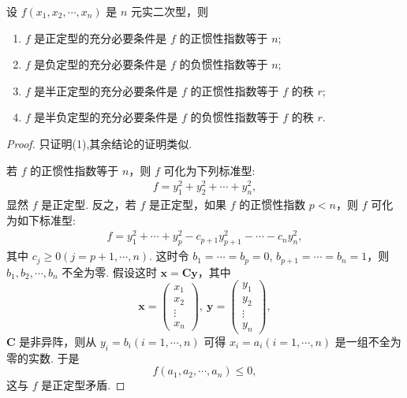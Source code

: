 \documentclass[../../main.tex]{subfiles}
\begin{document}
\begin{theorem}\label{theorem:正定型的充要条件}
设 $f(x_1,x_2,\cdots,x_n)$ 是 $n$ 元实二次型，则 
\begin{enumerate}[(1)]
\item $f$ 是正定型的充分必要条件是 $f$ 的正惯性指数等于 $n$;

\item $f$ 是负定型的充分必要条件是 $f$ 的负惯性指数等于 $n$; 

\item $f$ 是半正定型的充分必要条件是 $f$ 的正惯性指数等于 $f$ 的秩 $r$; 

\item $f$ 是半负定型的充分必要条件是 $f$ 的负惯性指数等于 $f$ 的秩 $r$.
\end{enumerate}
\end{theorem}
\begin{proof}
只证明(1),其余结论的证明类似. 

若 $f$ 的正惯性指数等于 $n$，则 $f$ 可化为下列标准型:
\begin{align*}
f = y_1^2 + y_2^2 + \cdots + y_n^2,
\end{align*}
显然 $f$ 是正定型. 反之，若 $f$ 是正定型，如果 $f$ 的正惯性指数 $p < n$，则 $f$ 可化为如下标准型:
\begin{align}
f = y_1^2 + \cdots + y_p^2 - c_{p + 1}y_{p + 1}^2 - \cdots - c_ny_n^2,\label{eq:8.4.1}
\end{align}
其中 $c_j\geq 0 (j = p + 1,\cdots,n)$. 这时令 $b_1 = \cdots = b_p = 0$, $b_{p + 1} = \cdots = b_n = 1$，则 $b_1,b_2,\cdots,b_n$ 不全为零. 假设这时 $\boldsymbol{x}=\boldsymbol{C}\boldsymbol{y}$，其中
\[
\boldsymbol{x}=\begin{pmatrix}
x_1\\
x_2\\
\vdots\\
x_n
\end{pmatrix},\ \boldsymbol{y}=\begin{pmatrix}
y_1\\
y_2\\
\vdots\\
y_n
\end{pmatrix},
\]
$\boldsymbol{C}$ 是非异阵，则从 $y_i = b_i (i = 1,\cdots,n)$ 可得 $x_i = a_i (i = 1,\cdots,n)$ 是一组不全为零的实数. 于是
\[
f(a_1,a_2,\cdots,a_n)\leq 0,
\]
这与 $f$ 是正定型矛盾. 
\end{proof}
\end{document}
